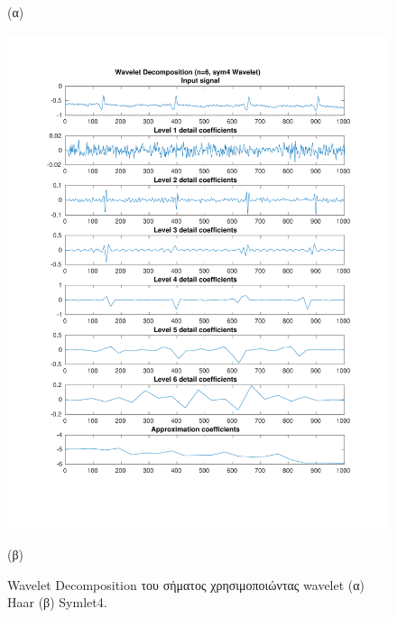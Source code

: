 \documentclass[11pt,a4paper]{article}
\begin{document}
\begin{figure}[H]
\begin{minipage}{0.48\textwidth}
	(α)
\end{minipage}
\begin{minipage}{0.48\textwidth}
	\centering
	\includegraphics[width=\textwidth]{fig/112l2_dwt2.pdf}
	
	(β)
\end{minipage}
\vfill
\caption{Wavelet Decomposition του σήματος χρησιμοποιώντας wavelet (α) Haar (β) Symlet4.}
\label{fig:112l2_dwt}
\end{figure}
\end{document}
